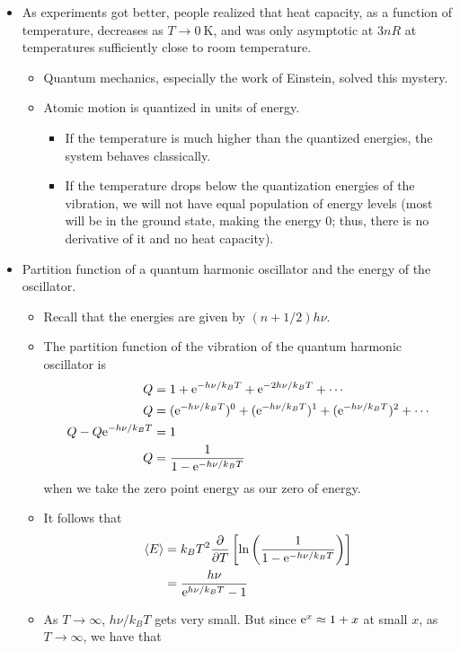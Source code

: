 \documentclass[../notes.tex]{subfiles}
\begin{document}
\begin{itemize}
\begin{itemize}
    \end{itemize}
    \item As experiments got better, people realized that heat capacity, as a function of temperature, decreases as $T\to\SI{0}{\kelvin}$, and was only asymptotic at $3nR$ at temperatures sufficiently close to room temperature.
    \begin{itemize}
        \item Quantum mechanics, especially the work of Einstein, solved this mystery.
        \item Atomic motion is quantized in units of energy.
        \begin{itemize}
            \item If the temperature is much higher than the quantized energies, the system behaves classically.
            \item If the temperature drops below the quantization energies of the vibration, we will not have equal population of energy levels (most will be in the ground state, making the energy 0; thus, there is no derivative of it and no heat capacity).
        \end{itemize}
    \end{itemize}
    \item Partition function of a quantum harmonic oscillator and the energy of the oscillator.
    \begin{itemize}
        \item Recall that the energies are given by $(n+1/2)h\nu$.
        \item The partition function of the vibration of the quantum harmonic oscillator is
        \begin{align*}
            Q &= 1+\e[-h\nu/k_BT]+\e[-2h\nu/k_BT]+\cdots\\
            Q &= (\e[-h\nu/k_BT])^0+(\e[-h\nu/k_BT])^1+(\e[-h\nu/k_BT])^2+\cdots\\
            Q-Q\e[-h\nu/k_BT] &= 1\\
            Q &= \frac{1}{1-\e[-h\nu/k_BT]}
        \end{align*}
        when we take the zero point energy as our zero of energy.
        \item It follows that
        \begin{align*}
            \prb{E} &= k_BT^2\pdv{T}\left[ \ln\left( \frac{1}{1-\e[-h\nu/k_BT]} \right) \right]\\
            &= \frac{h\nu}{\e[h\nu/k_BT]-1}
        \end{align*}
        \item As $T\to\infty$, $h\nu/k_BT$ gets very small. But since $\e[x]\approx 1+x$ at small $x$, as $T\to\infty$, we have that

\end{itemize}
\end{itemize}
\end{document}
